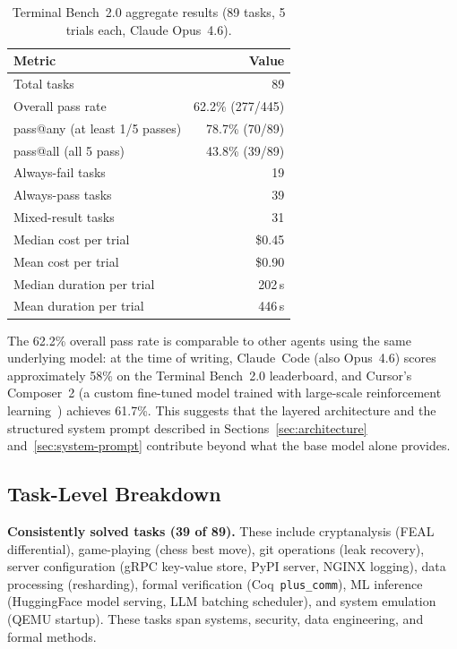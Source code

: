 \documentclass{article}
\begin{document}
\begin{table}[h]
\centering
\caption{Terminal Bench~2.0 aggregate results (89 tasks, 5 trials each, Claude Opus~4.6).}
\label{tab:tb2-aggregate}
\begin{tabular}{lr}
\toprule
\textbf{Metric} & \textbf{Value} \\
\midrule
Total tasks              & 89 \\
Overall pass rate        & 62.2\% (277/445) \\
pass@any (at least 1/5 passes) & 78.7\% (70/89) \\
pass@all (all 5 pass)    & 43.8\% (39/89) \\
Always-fail tasks        & 19 \\
Always-pass tasks        & 39 \\
Mixed-result tasks       & 31 \\
Median cost per trial    & \$0.45 \\
Mean cost per trial      & \$0.90 \\
Median duration per trial & 202\,s \\
Mean duration per trial  & 446\,s \\
\bottomrule
\end{tabular}
\end{table}

The 62.2\% overall pass rate is comparable to other agents using the same underlying model: at the time of writing, Claude~Code (also Opus~4.6) scores approximately 58\% on the Terminal Bench~2.0 leaderboard, and Cursor's Composer~2 (a custom fine-tuned model trained with large-scale reinforcement learning~\citep{cursor2026composer2}) achieves 61.7\%.  This suggests that the layered architecture and the structured system prompt described in Sections~\ref{sec:architecture} and~\ref{sec:system-prompt} contribute beyond what the base model alone provides.

\subsection{Task-Level Breakdown}

\textbf{Consistently solved tasks (39 of 89).} These include cryptanalysis (FEAL differential), game-playing (chess best move), git operations (leak recovery), server configuration (gRPC key-value store, PyPI server, NGINX logging), data processing (resharding), formal verification (Coq~\texttt{plus\_comm}), ML inference (HuggingFace model serving, LLM batching scheduler), and system emulation (QEMU startup).  These tasks span systems, security, data engineering, and formal methods.
\end{document}
